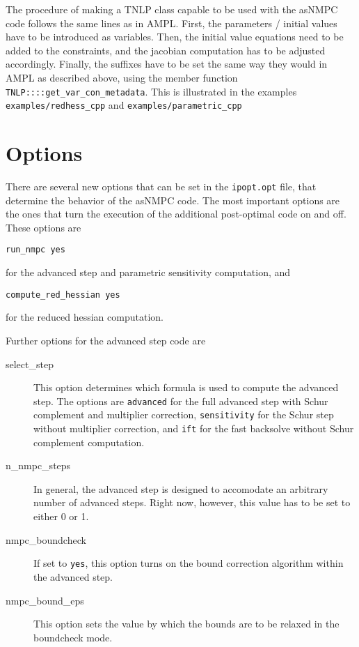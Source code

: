 \documentclass[a4paper]{article}
\begin{document}
The procedure of making a TNLP class capable to be used with the asNMPC code follows the same lines as in AMPL. First, the parameters / initial values have to be introduced as variables. Then, the initial value equations need to be added to the constraints, and the jacobian computation has to be adjusted accordingly. Finally, the suffixes have to be set the same way they would in AMPL as described above, using the member function {\tt TNLP::::get\_var\_con\_metadata}. This is illustrated in the examples {\tt examples/redhess\_cpp} and {\tt examples/parametric\_cpp}
\section{Options}
There are several new options that can be set in the {\tt ipopt.opt} file, that determine the behavior of the asNMPC code. The most important options are the ones that turn the execution of the additional post-optimal code on and off. These options are 
\begin{verbatim}
run_nmpc yes
\end{verbatim}
for the advanced step and parametric sensitivity computation, and
\begin{verbatim}
compute_red_hessian yes
\end{verbatim}
for the reduced hessian computation. 

Further options for the advanced step code are
\begin{description}
\item[select\_step] This option determines which formula is used to compute the advanced step. The options are \texttt{advanced} for the full advanced step with Schur complement and multiplier correction, \texttt{sensitivity} for the Schur step without multiplier correction, and \texttt{ift} for the fast backsolve without Schur complement computation.
\item[n\_nmpc\_steps] In general, the advanced step is designed to accomodate an arbitrary number of advanced steps. Right now, however, this value has to be set to either 0 or 1.
\item[nmpc\_boundcheck] If set to \texttt{yes}, this option turns on the bound correction algorithm within the advanced step. 
\item[nmpc\_bound\_eps] This option sets the value by which the bounds are to be relaxed in the boundcheck mode. 
\end{description}


\end{document}
